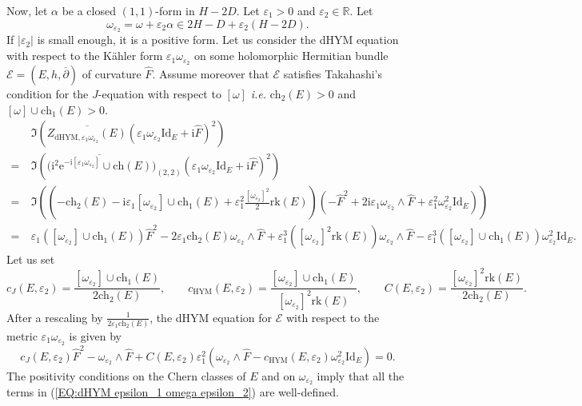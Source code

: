 \documentclass{article}
\theoremstyle{remark}
\theoremstyle{definition}
\newcommand{\R}{\mathbb{R}}
\newcommand{\rk}{\mathrm{rk}}
\newcommand{\Id}{\mathrm{Id}}
\renewcommand{\i}{\boldsymbol{\mathrm{i}}}
\newcommand{\e}{\boldsymbol{\mathrm{e}}}
\newcommand{\abs}[1]{\left| #1 \right|}
\newcommand{\E}{\mathcal{E}}
\newcommand{\dbar}{\overline{\partial}}
\newcommand{\ch}{\mathrm{ch}}
\begin{document}
Now, let $\alpha$ be a closed $(1,1)$-form in $H - 2D$. Let $\varepsilon_1 > 0$ and $\varepsilon_2 \in \R$. Let
$$
\omega_{\varepsilon_2} = \omega + \varepsilon_2\alpha \in 2H - D + \varepsilon_2(H - 2D).
$$
If $\abs{\varepsilon_2}$ is small enough, it is a positive form. Let us consider the dHYM equation with respect to the Kähler form $\varepsilon_1\omega_{\varepsilon_2}$ on some holomorphic Hermitian bundle $\E = (E,h,\dbar)$ of curvature $\hat{F}$. Assume moreover that $\E$ satisfies Takahashi's condition for the $J$-equation with respect to $[\omega]$ \textit{i.e.} $\ch_2(E) > 0$ and $[\omega] \cup \ch_1(E) > 0$.
\begin{align*}
    & \Im(\overline{Z_{\mathrm{dHYM},\varepsilon_1\omega_{\varepsilon_2}}(E)}(\varepsilon_1\omega_{\varepsilon_2}\Id_E + \i\hat{F})^2)\\
    =\ & \Im\left(\overline{(\i^2\e^{-\i[\varepsilon_1\omega_{\varepsilon_2}]} \cup \ch(E)})_{(2,2)}(\varepsilon_1\omega_{\varepsilon_2}\Id_E + \i\hat{F})^2\right)\\
    =\ & \Im\left(\left(-\ch_2(E) - \i\varepsilon_1[\omega_{\varepsilon_2}] \cup \ch_1(E) + \varepsilon_1^2\frac{[\omega_{\varepsilon_2}]^2}{2}\rk(E)\right)(-\hat{F}^2 + 2\i\varepsilon_1\omega_{\varepsilon_2} \wedge \hat{F} + \varepsilon_1^2\omega_{\varepsilon_2}^2\Id_E)\right)\\
    =\ & \varepsilon_1([\omega_{\varepsilon_2}] \cup \ch_1(E))\hat{F}^2 - 2\varepsilon_1\ch_2(E)\omega_{\varepsilon_2} \wedge \hat{F} + \varepsilon_1^3([\omega_{\varepsilon_2}]^2\rk(E))\omega_{\varepsilon_2} \wedge \hat{F} - \varepsilon_1^3([\omega_{\varepsilon_2}] \cup \ch_1(E))\omega_{\varepsilon_2}^2\Id_E.
\end{align*}
Let us set
$$
c_J(E,\varepsilon_2) = \frac{[\omega_{\varepsilon_2}] \cup \ch_1(E)}{2\ch_2(E)}, \qquad c_{\mathrm{HYM}}(E,\varepsilon_2) = \frac{[\omega_{\varepsilon_2}] \cup \ch_1(E)}{[\omega_{\varepsilon_2}]^2\rk(E)}, \qquad C(E,\varepsilon_2) = \frac{[\omega_{\varepsilon_2}]^2\rk(E)}{2\ch_2(E)}.
$$
After a rescaling by $\frac{1}{2\varepsilon_1\ch_2(E)}$, the dHYM equation for $\E$ with respect to the metric $\varepsilon_1\omega_{\varepsilon_2}$ is given by
\begin{equation}\label{EQ:dHYM epsilon_1 omega epsilon_2}
c_J(E,\varepsilon_2)\hat{F}^2 - \omega_{\varepsilon_2} \wedge \hat{F} + C(E,\varepsilon_2)\varepsilon_1^2(\omega_{\varepsilon_2} \wedge \hat{F} - c_{\mathrm{HYM}}(E,\varepsilon_2)\omega_{\varepsilon_2}^2\Id_E) = 0.
\end{equation}
The positivity conditions on the Chern classes of $E$ and on $\omega_{\varepsilon_2}$ imply that all the terms in (\ref{EQ:dHYM epsilon_1 omega epsilon_2}) are well-defined.
\end{document}
